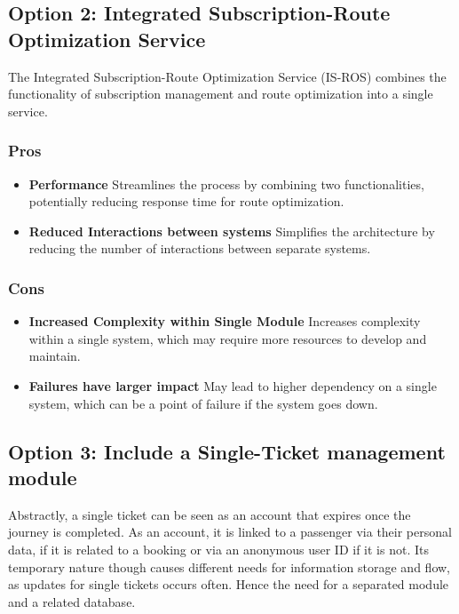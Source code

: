 \subsection*{Option 2: Integrated Subscription-Route Optimization Service}
The Integrated Subscription-Route Optimization Service (IS-ROS) combines the functionality of subscription management and route optimization into a single service. 
\subsubsection*{Pros}
\begin{itemize}[noitemsep]
    \item \textbf{Performance} Streamlines the process by combining two functionalities, potentially reducing response time for route optimization.
    \item \textbf{Reduced Interactions between systems} Simplifies the architecture by reducing the number of interactions between separate systems.
\end{itemize}
\subsubsection*{Cons}
\begin{itemize}[noitemsep]
    \item \textbf{Increased Complexity within Single Module} Increases complexity within a single system, which may require more resources to develop and maintain.
    \item \textbf{Failures have larger impact} May lead to higher dependency on a single system, which can be a point of failure if the system goes down.
\end{itemize}

\subsection*{Option 3: Include a Single-Ticket management module}
Abstractly, a single ticket can be seen as an account that expires once the journey is completed. As an account, it is linked to a passenger via their personal data, if it is related to a booking or via 
an anonymous user ID if it is not.
Its temporary nature though causes different needs for information storage and flow, as updates for single tickets occurs often.
Hence the need for a separated module and a related database.


